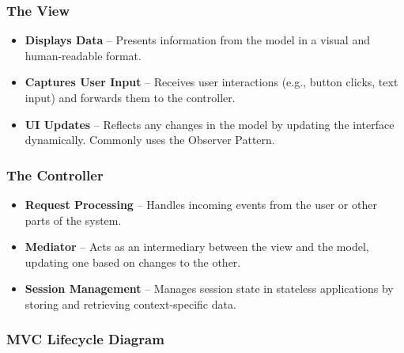\documentclass{article}
\begin{document}
\subsubsection*{The View}
\begin{itemize}
\item \textbf{Displays Data} – Presents information from the model in a visual and human-readable format.
\item \textbf{Captures User Input} – Receives user interactions (e.g., button clicks, text input) and forwards them to the controller.
\item \textbf{UI Updates} – Reflects any changes in the model by updating the interface dynamically. Commonly uses the Observer Pattern.
\end{itemize}

\subsubsection*{The Controller}
\begin{itemize}
\item \textbf{Request Processing} – Handles incoming events from the user or other parts of the system.
\item \textbf{Mediator} – Acts as an intermediary between the view and the model, updating one based on changes to the other.
\item \textbf{Session Management} – Manages session state in stateless applications by storing and retrieving context-specific data.
\end{itemize}

\subsubsection{MVC Lifecycle Diagram}

\begin{center}
\end{center}
\end{document}
